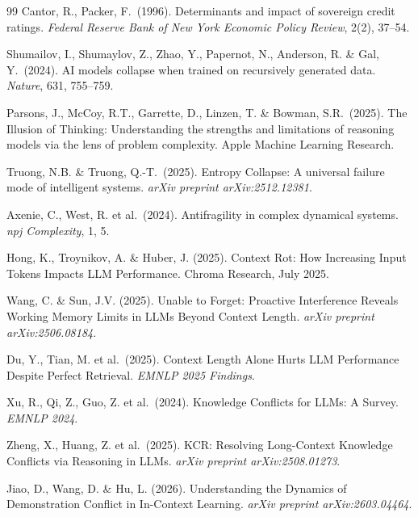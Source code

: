 \documentclass[11pt,a4paper]{article}
\begin{document}
\begin{thebibliography}{99}
Cantor, R., Packer, F.\ (1996).
Determinants and impact of sovereign credit ratings.
\emph{Federal Reserve Bank of New York Economic Policy Review}, 2(2), 37--54.

Shumailov, I., Shumaylov, Z., Zhao, Y., Papernot, N., Anderson, R. \& Gal, Y.\ (2024).
AI models collapse when trained on recursively generated data.
\emph{Nature}, 631, 755--759.

Parsons, J., McCoy, R.T., Garrette, D., Linzen, T. \& Bowman, S.R.\ (2025).
The Illusion of Thinking: Understanding the strengths and limitations of reasoning models via the lens of problem complexity.
Apple Machine Learning Research.

Truong, N.B. \& Truong, Q.-T.\ (2025).
Entropy Collapse: A universal failure mode of intelligent systems.
\emph{arXiv preprint arXiv:2512.12381}.

Axenie, C., West, R. et al.\ (2024).
Antifragility in complex dynamical systems.
\emph{npj Complexity}, 1, 5.

Hong, K., Troynikov, A. \& Huber, J. (2025).
Context Rot: How Increasing Input Tokens Impacts LLM Performance.
Chroma Research, July 2025.

Wang, C. \& Sun, J.V. (2025).
Unable to Forget: Proactive Interference Reveals Working Memory Limits in LLMs Beyond Context Length.
\emph{arXiv preprint arXiv:2506.08184}.

Du, Y., Tian, M. et al.\ (2025).
Context Length Alone Hurts LLM Performance Despite Perfect Retrieval.
\emph{EMNLP 2025 Findings}.

Xu, R., Qi, Z., Guo, Z. et al.\ (2024).
Knowledge Conflicts for LLMs: A Survey.
\emph{EMNLP 2024}.

Zheng, X., Huang, Z. et al.\ (2025).
KCR: Resolving Long-Context Knowledge Conflicts via Reasoning in LLMs.
\emph{arXiv preprint arXiv:2508.01273}.

Jiao, D., Wang, D. \& Hu, L. (2026).
Understanding the Dynamics of Demonstration Conflict in In-Context Learning.
\emph{arXiv preprint arXiv:2603.04464}.

\end{thebibliography}
\end{document}
